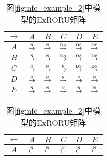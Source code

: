 \begin{table}[htbp]
  \begin{subtable}{1\textwidth}
    \vspace{1em}
    \centering
    \caption{图\ref{fig:nfc_example_2}中模型的ExRORU矩阵}
    \label{tab:nfc_example_2_matrix}
    \begin{minipage}[b]{0.3\textwidth}
      \centering
      \begin{tabular}{|c|c|c|c|c|c|} \hline
        $\rightarrow$ & $A$ & $B$ & $C$ & $D$ & $E$\\ \hline
        $A$ & $\overset{\text{\tiny{N}}}{\rightarrow}$ & $\overset{\text{\tiny{N}}}{\rightarrow}$ & $\overset{\text{\tiny{DA}}}{\rightarrow}$ & \cellcolor{lightgray}$\overset{\text{\tiny{DS}}}{\rightarrow}$ & \cellcolor{lightgray}$\overset{\text{\tiny{DS}}}{\rightarrow}$\\ \hline
        $B$ & $\overset{\text{\tiny{N}}}{\rightarrow}$ & $\overset{\text{\tiny{N}}}{\rightarrow}$ & $\overset{\text{\tiny{DA}}}{\rightarrow}$ & \cellcolor{lightgray}$\overset{\text{\tiny{DS}}}{\rightarrow}$ & \cellcolor{lightgray}$\overset{\text{\tiny{DS}}}{\rightarrow}$\\ \hline
        $C$ & $\overset{\text{\tiny{N}}}{\rightarrow}$ & $\overset{\text{\tiny{N}}}{\rightarrow}$ & $\overset{\text{\tiny{N}}}{\rightarrow}$ & $\overset{\text{\tiny{DS}}}{\rightarrow}$ & $\overset{\text{\tiny{DS}}}{\rightarrow}$\\ \hline
        $D$ & $\overset{\text{\tiny{N}}}{\rightarrow}$ & $\overset{\text{\tiny{N}}}{\rightarrow}$ & $\overset{\text{\tiny{N}}}{\rightarrow}$ & $\overset{\text{\tiny{N}}}{\rightarrow}$ & $\overset{\text{\tiny{N}}}{\rightarrow}$\\ \hline
        $E$ & $\overset{\text{\tiny{N}}}{\rightarrow}$ & $\overset{\text{\tiny{N}}}{\rightarrow}$ & $\overset{\text{\tiny{N}}}{\rightarrow}$ & $\overset{\text{\tiny{N}}}{\rightarrow}$ & $\overset{\text{\tiny{N}}}{\rightarrow}$\\ \hline
      \end{tabular}
    \end{minipage}
    \begin{minipage}[b]{0.3\textwidth}
      \centering
      \begin{tabular}{|c|c|c|c|c|c|} \hline
        $\leftarrow$ & $A$ & $B$ & $C$ & $D$ & $E$\\ \hline
        $A$ & $\overset{\text{\tiny{N}}}{\leftarrow}$ & $\overset{\text{\tiny{N}}}{\leftarrow}$ & $\overset{\text{\tiny{N}}}{\leftarrow}$ & $\overset{\text{\tiny{N}}}{\leftarrow}$ & $\overset{\text{\tiny{N}}}{\leftarrow}$\\ \hline

\end{tabular}
\end{minipage}
\end{subtable}
\end{table}
